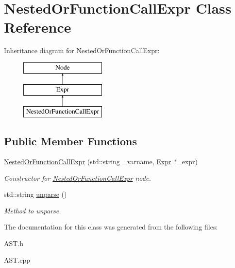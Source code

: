 \hypertarget{classNestedOrFunctionCallExpr}{\section{Nested\-Or\-Function\-Call\-Expr Class Reference}
\label{classNestedOrFunctionCallExpr}
}
Inheritance diagram for Nested\-Or\-Function\-Call\-Expr\-:\begin{figure}[H]
\begin{center}
\leavevmode
\includegraphics[height=3.000000cm]{classNestedOrFunctionCallExpr}
\end{center}
\end{figure}
\subsection*{Public Member Functions}
\begin{DoxyCompactItemize}
\item 
\hypertarget{classNestedOrFunctionCallExpr_abdf4c721e93d55f3983669df76d6cc24}{\hyperlink{classNestedOrFunctionCallExpr_abdf4c721e93d55f3983669df76d6cc24}{Nested\-Or\-Function\-Call\-Expr} (std\-::string \-\_\-varname, \hyperlink{classExpr}{Expr} $\ast$\-\_\-expr)}\label{classNestedOrFunctionCallExpr_abdf4c721e93d55f3983669df76d6cc24}

\begin{DoxyCompactList}\small\item\em Constructor for \hyperlink{classNestedOrFunctionCallExpr}{Nested\-Or\-Function\-Call\-Expr} node. \end{DoxyCompactList}\item 
\hypertarget{classNestedOrFunctionCallExpr_aac49f863b8cf73a671479b4d414f61bd}{std\-::string \hyperlink{classNestedOrFunctionCallExpr_aac49f863b8cf73a671479b4d414f61bd}{unparse} ()}\label{classNestedOrFunctionCallExpr_aac49f863b8cf73a671479b4d414f61bd}

\begin{DoxyCompactList}\small\item\em Method to unparse. \end{DoxyCompactList}\end{DoxyCompactItemize}


The documentation for this class was generated from the following files\-:\begin{DoxyCompactItemize}
\item 
A\-S\-T.\-h\item 
A\-S\-T.\-cpp\end{DoxyCompactItemize}
